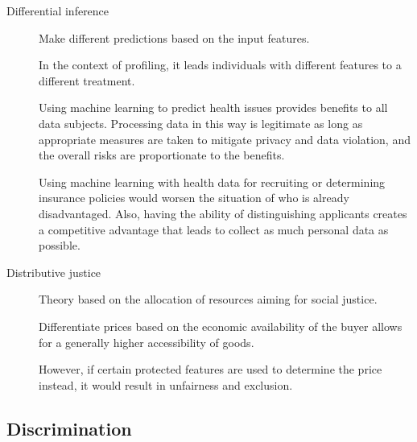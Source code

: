 \begin{description}
    \item[Differential inference] 
        Make different predictions based on the input features. 
        
        In the context of profiling, it leads individuals with different features to a different treatment.

        \begin{example}[ML in healthcare]
            Using machine learning to predict health issues provides benefits to all data subjects. Processing data in this way is legitimate as long as appropriate measures are taken to mitigate privacy and data violation, and the overall risks are proportionate to the benefits.
        \end{example}
        
        \begin{example}
            Using machine learning with health data for recruiting or determining insurance policies would worsen the situation of who is already disadvantaged. Also, having the ability of distinguishing applicants creates a competitive advantage that leads to collect as much personal data as possible.
        \end{example}
\end{description}

\begin{description}
    \item[Distributive justice] 
        Theory based on the allocation of resources aiming for social justice.

        \begin{example}
            Differentiate prices based on the economic availability of the buyer allows for a generally higher accessibility of goods.

            However, if certain protected features are used to determine the price instead, it would result in unfairness and exclusion.
        \end{example}
\end{description}


\subsection{Discrimination}

